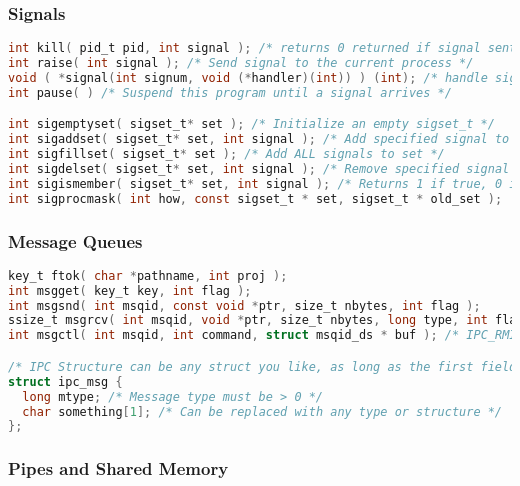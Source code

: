\documentclass[legalpaper,10pt]{article}
\begin{document}
\subsubsection*{Signals}

\begin{lstlisting}[language=C]
int kill( pid_t pid, int signal ); /* returns 0 returned if signal sent, -1 if an error */
int raise( int signal ); /* Send signal to the current process */
void ( *signal(int signum, void (*handler)(int)) ) (int); /* handle signal */ 
int pause( ) /* Suspend this program until a signal arrives */

int sigemptyset( sigset_t* set ); /* Initialize an empty sigset_t */
int sigaddset( sigset_t* set, int signal ); /* Add specified signal to set */
int sigfillset( sigset_t* set ); /* Add ALL signals to set */
int sigdelset( sigset_t* set, int signal ); /* Remove specified signal from set */ 
int sigismember( sigset_t* set, int signal ); /* Returns 1 if true, 0 if false */
int sigprocmask( int how, const sigset_t * set, sigset_t * old_set ); 
\end{lstlisting}

\subsubsection*{Message Queues}
\begin{lstlisting}[language=C]
key_t ftok( char *pathname, int proj );
int msgget( key_t key, int flag ); 
int msgsnd( int msqid, const void *ptr, size_t nbytes, int flag );
ssize_t msgrcv( int msqid, void *ptr, size_t nbytes, long type, int flag );
int msgctl( int msqid, int command, struct msqid_ds * buf ); /* IPC_RMID for command, NULL for buf */

/* IPC Structure can be any struct you like, as long as the first field is long */
struct ipc_msg {
  long mtype; /* Message type must be > 0 */
  char something[1]; /* Can be replaced with any type or structure */
};

\end{lstlisting}

\subsubsection*{Pipes and Shared Memory}
\end{document}

